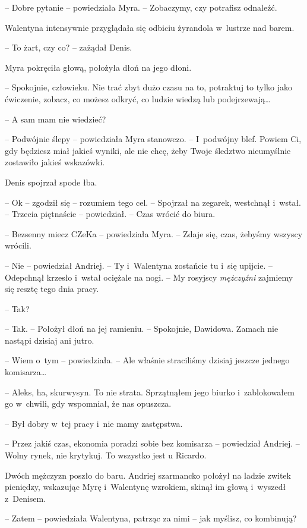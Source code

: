 \documentclass[oneside,polish,11pt,sfheadings]{mwbk}
\begin{document}
-- Dobre pytanie -- powiedziała Myra. -- Zobaczymy, czy potrafisz odnaleźć.

Walentyna intensywnie przyglądała się odbiciu żyrandola w~lustrze nad
barem.

-- To żart, czy co? -- zażądał Denis.

Myra pokręciła głową, położyła dłoń na jego dłoni. 

-- Spokojnie,
człowieku. Nie trać zbyt dużo czasu na to, potraktuj to tylko jako
ćwiczenie, zobacz, co możesz odkryć, co ludzie wiedzą lub
podejrzewają\ldots

-- A sam mam nie wiedzieć?

-- Podwójnie ślepy -- powiedziała Myra stanowczo. -- I~podwójny blef.
Powiem Ci, gdy będziesz miał jakieś wyniki, ale nie chcę, żeby Twoje
śledztwo nieumyślnie zostawiło jakieś wskazówki.

Denis spojrzał spode łba. 

-- Ok -- zgodził się -- rozumiem tego cel. -- Spojrzał na zegarek, westchnął i~wstał. -- Trzecia piętnaście -- powiedział. -- Czas wrócić do biura.

-- Bezsenny miecz CZeKa -- powiedziała Myra. -- Zdaje się, czas, żebyśmy
wszyscy wrócili.

-- Nie -- powiedział Andriej. -- Ty i~Walentyna zostańcie tu i~się upijcie.
-- Odepchnął krzesło i~wstał ociężale na nogi. -- My rosyjscy
\textit{mężczyźni} zajmiemy się resztę tego dnia pracy.

-- Tak?

-- Tak. -- Położył dłoń na jej ramieniu. -- Spokojnie, Dawidowa. Zamach nie
nastąpi dzisiaj ani jutro.

-- Wiem o~tym -- powiedziała. -- Ale właśnie straciliśmy dzisiaj jeszcze
jednego komisarza\ldots

-- Aleks, ha, skurwysyn. To nie strata. Sprzątnąłem jego biurko i~zablokowałem go w~chwili, gdy wspomniał, że nas opuszcza.

-- Był dobry w~tej pracy i~nie mamy zastępstwa.

-- Przez jakiś czas, ekonomia poradzi sobie bez komisarza -- powiedział
Andriej. -- Wolny rynek, nie krytykuj. To wszystko jest u Ricardo.

Dwóch mężczyzn poszło do baru. Andriej szarmancko położył na ladzie
zwitek pieniędzy, wskazując Myrę i~Walentynę wzrokiem, skinął im głową i~wyszedł z~Denisem.

-- Zatem -- powiedziała Walentyna, patrząc za nimi -- jak myślisz, co
kombinują?
\end{document}

